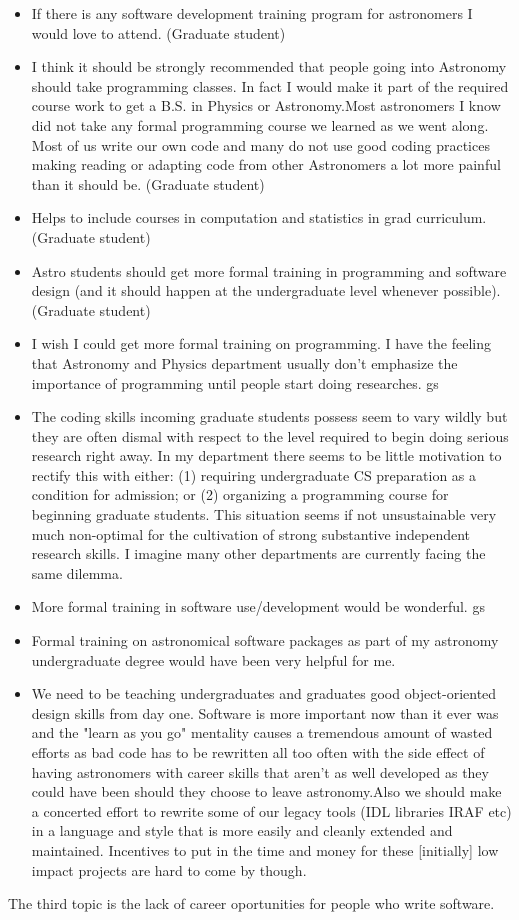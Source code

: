 \begin{itemize}
\item{If there is any software development training program for astronomers I would love to attend. (Graduate student)}
\item{I think it should be strongly recommended that people going into Astronomy should take programming classes. In fact I would make it part of the required course work to get a B.S. in Physics or Astronomy.Most astronomers I know did not take any formal programming course we learned as we went along. Most of us write our own code and many do not use good coding practices making reading or adapting code from other Astronomers a lot more painful than it should be. (Graduate student)}
\item{Helps to include courses in computation and statistics in grad curriculum. (Graduate student)}
\item{Astro students should get more formal training in programming and software design (and it should happen at the undergraduate level whenever possible). (Graduate student)}
\item{I wish I could get more formal training on programming. I have the feeling that Astronomy and Physics department usually don't emphasize the importance of programming until people start doing researches. gs}
\item{The coding skills incoming graduate students possess seem to vary wildly but they are often dismal with respect to the level required to begin doing serious research right away. In my department there seems to be little motivation to rectify this with either: (1) requiring undergraduate CS preparation as a condition for admission; or (2) organizing a programming course for beginning graduate students. This situation seems if not unsustainable very much non-optimal for the cultivation of strong substantive independent research skills. I imagine many other departments are currently facing the same dilemma.}
\item{More formal training in software use/development would be wonderful. gs}
\item{Formal training on astronomical software packages as part of my astronomy undergraduate degree would have been very helpful for me.}
\item{We need to be teaching undergraduates and graduates good object-oriented design skills from day one. Software is more important now than it ever was and the "learn as you go" mentality causes a tremendous amount of wasted efforts as bad code has to be rewritten all too often with the side effect of having astronomers with career skills that aren't as well developed as they could have been should they choose to leave astronomy.Also we should make a concerted effort to rewrite some of our legacy tools (IDL libraries IRAF etc) in a language and style that is more easily and cleanly extended and maintained. Incentives to put in the time and money for these [initially] low impact projects are hard to come by though.}

\end{itemize}

The third topic is the lack of career oportunities for people who write software.
